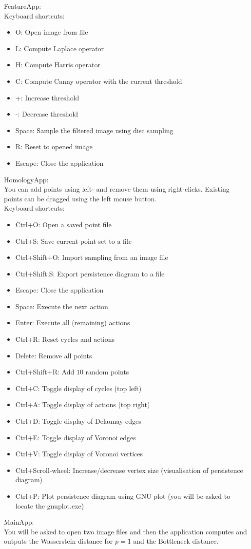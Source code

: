 \documentclass[11pt, a4paper, UKenglish]{article}
\begin{document}
    FeatureApp:\\
    Keyboard shortcuts:
    \begin{itemize}
    	\itemsep0em 
        \item O: Open image from file
        \item L: Compute Laplace operator
        \item H: Compute Harris operator
        \item C: Compute Canny operator with the current threshold
        \item +: Increase threshold
        \item -: Decrease threshold
        \item Space: Sample the filtered image using disc sampling
        \item R: Reset to opened image
        \item Escape: Close the application
    \end{itemize}
    HomologyApp:\\
    You can add points using left- and remove them using right-clicks.
    Existing points can be dragged using the left mouse button.\\
    Keyboard shortcuts:
    \begin{itemize}
    	\itemsep0em 
        \item Ctrl+O: Open a saved point file
        \item Ctrl+S: Save current point set to a file
        \item Ctrl+Shift+O: Import sampling from an image file
        \item Ctrl+Shift.S: Export persistence diagram to a file
        \item Escape: Close the application
        \item Space: Execute the next action
        \item Enter: Execute all (remaining) actions
        \item Ctrl+R: Reset cycles and actions
        \item Delete: Remove all points
        \item Ctrl+Shift+R: Add $10$ random points
        \item Ctrl+C: Toggle display of cycles (top left)
        \item Ctrl+A: Toggle display of actions (top right)
        \item Ctrl+D: Toggle display of Delaunay edges
        \item Ctrl+E: Toggle display of Voronoi edges
        \item Ctrl+V: Toggle display of Voronoi vertices
        \item Ctrl+Scroll-wheel: Increase/decrease vertex size (visualisation of persistence diagram)
        \item Ctrl+P: Plot persistence diagram using GNU plot (you will be asked to locate the gnuplot.exe)
    \end{itemize}
    MainApp:\\
    You will be asked to open two image files and then the application computes and outputs the Wasserstein distance for $p=1$ and the Bottleneck distance.
    
    
    

    \newpage
    
\end{document}
